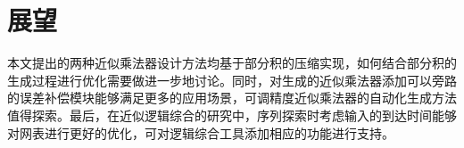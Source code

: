 \section{展望}

本文提出的两种近似乘法器设计方法均基于部分积的压缩实现，如何结合部分积的生成过程进行优化需要做进一步地讨论。同时，对生成的近似乘法器添加可以旁路的误差补偿模块能够满足更多的应用场景，可调精度近似乘法器的自动化生成方法值得探索。最后，在近似逻辑综合的研究中，序列探索时考虑输入的到达时间能够对网表进行更好的优化，可对逻辑综合工具添加相应的功能进行支持。